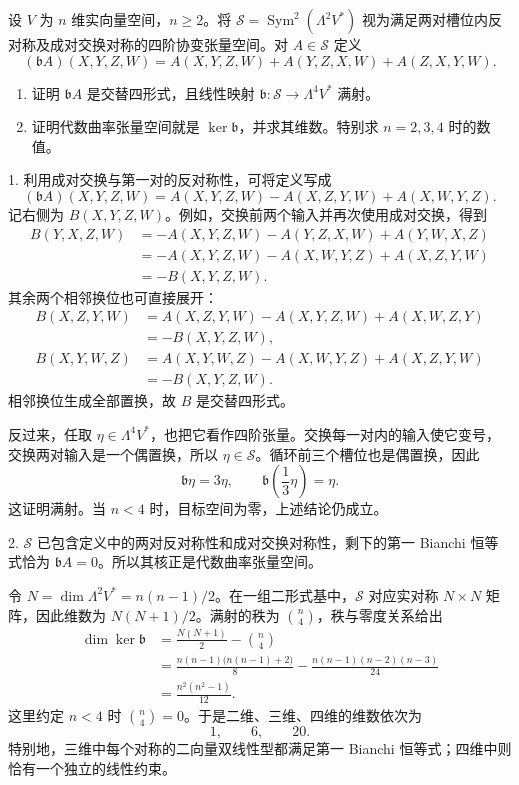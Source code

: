 \begin{exercise}\label{g3:ex:algebraic-curvature-dimension}
	设 \(V\) 为 \(n\) 维实向量空间，\(n\ge2\)。将 \(\mathcal S=\operatorname{Sym}^2(\Lambda^2V^*)\) 视为满足两对槽位内反对称及成对交换对称的四阶协变张量空间。对 \(A\in\mathcal S\) 定义
	\[
		(\mathfrak bA)(X,Y,Z,W)
		=A(X,Y,Z,W)+A(Y,Z,X,W)+A(Z,X,Y,W).
	\]
	\begin{enumerate}
		\item 证明 \(\mathfrak bA\) 是交替四形式，且线性映射
		\(\mathfrak b:\mathcal S\to\Lambda^4V^*\) 满射。
		\item 证明代数曲率张量空间就是 \(\ker\mathfrak b\)，并求其维数。特别求 \(n=2,3,4\) 时的数值。
	\end{enumerate}
\end{exercise}
\begin{solution}
	1. 利用成对交换与第一对的反对称性，可将定义写成
	\[
		(\mathfrak bA)(X,Y,Z,W)
		=A(X,Y,Z,W)-A(X,Z,Y,W)+A(X,W,Y,Z).
	\]
	记右侧为 \(B(X,Y,Z,W)\)。例如，交换前两个输入并再次使用成对交换，得到
	\[
		\begin{aligned}
			B(Y,X,Z,W)
			&=-A(X,Y,Z,W)-A(Y,Z,X,W)+A(Y,W,X,Z)\\
			&=-A(X,Y,Z,W)-A(X,W,Y,Z)+A(X,Z,Y,W)\\
			&=-B(X,Y,Z,W).
		\end{aligned}
	\]
	其余两个相邻换位也可直接展开：
	\[
		\begin{aligned}
			B(X,Z,Y,W)
			&=A(X,Z,Y,W)-A(X,Y,Z,W)+A(X,W,Z,Y)\\
			&=-B(X,Y,Z,W),\\
			B(X,Y,W,Z)
			&=A(X,Y,W,Z)-A(X,W,Y,Z)+A(X,Z,Y,W)\\
			&=-B(X,Y,Z,W).
		\end{aligned}
	\]
	相邻换位生成全部置换，故 \(B\) 是交替四形式。

	反过来，任取 \(\eta\in\Lambda^4V^*\)，也把它看作四阶张量。交换每一对内的输入使它变号，交换两对输入是一个偶置换，所以 \(\eta\in\mathcal S\)。循环前三个槽位也是偶置换，因此
	\[
		\mathfrak b\eta=3\eta,\qquad
		\mathfrak b\left(\frac13\eta\right)=\eta.
	\]
	这证明满射。当 \(n<4\) 时，目标空间为零，上述结论仍成立。

	2. \(\mathcal S\) 已包含定义中的两对反对称性和成对交换对称性，剩下的第一 Bianchi 恒等式恰为 \(\mathfrak bA=0\)。所以其核正是代数曲率张量空间。

	令 \(N=\dim\Lambda^2V^*=n(n-1)/2\)。在一组二形式基中，\(\mathcal S\) 对应实对称 \(N\times N\) 矩阵，因此维数为 \(N(N+1)/2\)。满射的秩为 \(\binom n4\)，秩与零度关系给出
	\[
		\begin{aligned}
			\dim\ker\mathfrak b
			&=\frac{N(N+1)}2-\binom n4\\
			&=\frac{n(n-1)\bigl(n(n-1)+2\bigr)}8
				-\frac{n(n-1)(n-2)(n-3)}{24}\\
			&=\frac{n^2(n^2-1)}{12}.
		\end{aligned}
	\]
	这里约定 \(n<4\) 时 \(\binom n4=0\)。于是二维、三维、四维的维数依次为
	\[
		1,\qquad6,\qquad20.
	\]
	特别地，三维中每个对称的二向量双线性型都满足第一 Bianchi 恒等式；四维中则恰有一个独立的线性约束。
\end{solution}

